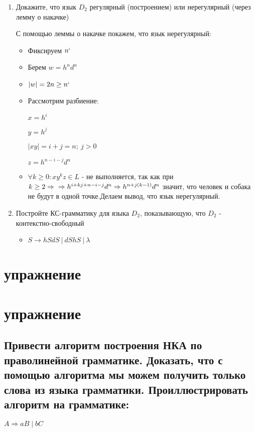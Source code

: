 \documentclass{article}
\begin{document}
        \begin{enumerate}
            \item Докажите, что язык $D_2$ регулярный (построением) или нерегулярный (через лемму о накачке)
 
            С помощью леммы о накачке покажем, что язык нерегулярный:
            \begin{itemize}
             
            
                \item Фиксируем $n`$
                \item Берем $w = h^nd^n$
                \item $|w| = 2n \geq n`$
                \item Рассмотрим разбиение:
 
                $x = h^i$
 
                $y = h^j$
 
                $|xy| = i + j = n; \: j > 0$
 
                $z = h^{n-i-j}d^n$
 
                \item $\forall k \geq 0: xy^kz \in L$ - не выполняется, так как при $k \geq 2\Rightarrow\newline \Rightarrow h^{i+kj+n-i-j}d^n \Rightarrow h^{n+j(k-1)}d^n$  значит, что человек и собака не будут в одной точке.\newline Делаем вывод, что язык нерегулярный.
            \end{itemize}
 
            \item Постройте КС-грамматику для языка $D_2$, показывающую, что $D_2$ - контекстно-свободный
 
                \begin{itemize}
                    \item $S \to hSdS \: | \: dShS \: | \: \lambda$
                \end{itemize}
 
 
        \end{enumerate}
        \section{упражнение}
        \section{упражнение}
\subsection{ Привести алгоритм построения НКА по праволинейной грамматике. Доказать, что с помощью алгоритма мы можем получить только слова из языка грамматики. Проиллюстрировать алгоритм на грамматике:}
\newline
    $A \Rightarrow aB\;|\;bC$
 
\end{document}
